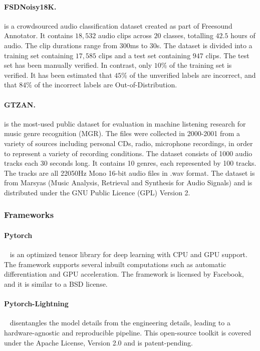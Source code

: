 \documentclass{article}
\begin{document}
\paragraph{FSDNoisy18K.} \citep{fsd} is a crowdsourced audio classification dataset created as part of Freesound Annotator. It contains $18,532$ audio clips across $20$ classes, totalling $42.5$ hours of audio. The clip durations range from $300$ms to $30$s. The dataset is divided into a training set containing $17,585$ clips and a test set containing $947$ clips. The test set has been manually verified. In contrast, only $10\%$ of the training set is verified. It has been estimated that $45\%$ of the unverified labels are incorrect, and that $84\%$ of the incorrect labels are Out-of-Distribution.
\paragraph{GTZAN.} \citep{gtzan} is the most-used public dataset for evaluation in machine listening research for music genre recognition (MGR). The files were collected in 2000-2001 from a variety of sources including personal CDs, radio, microphone recordings, in order to represent a variety of recording conditions. The dataset consists of 1000 audio tracks each 30 seconds long. It contains 10 genres, each represented by 100 tracks. The tracks are all 22050Hz Mono 16-bit audio files in .wav format. The dataset is from Marsyas (Music Analysis, Retrieval and Synthesis for Audio Signals) and is distributed under the GNU Public Licence (GPL) Version 2.
\subsubsection{Frameworks}
\paragraph{Pytorch} ~\citep{pytorch} is an optimized tensor library for deep learning with CPU and GPU support. The framework supports several inbuilt computations such as automatic differentiation and GPU acceleration. The framework is licensed by Facebook, and it is similar to a BSD license. 
\paragraph{Pytorch-Lightning} ~\citep{lightning} disentangles the model details from the engineering details, leading to a hardware-agnostic and reproducible pipeline. This open-source toolkit is covered under the Apache License, Version 2.0 and is patent-pending.
\end{document}
